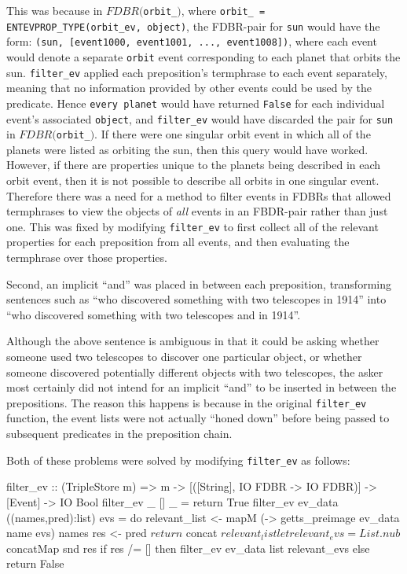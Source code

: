 \documentclass[../main.tex]{subfiles}
\begin{document}
This was because in $FDBR($\texttt{orbit\_}$)$, where \texttt{orbit\_ = ENTEVPROP\_TYPE(orbit\_ev, object)}, the FDBR-pair for \texttt{sun} would have the form: \texttt{(sun, [event1000, event1001, ..., event1008])}, where each event would denote a separate \texttt{orbit} event corresponding to each planet that orbits the sun.  \texttt{filter\_ev} applied each preposition's termphrase to each event separately, meaning that no information provided by other events could be used by the predicate.  Hence \texttt{every planet} would have returned \texttt{False} for each individual event's associated \texttt{object}, and \texttt{filter\_ev} would have discarded the pair for \texttt{sun} in $FDBR($\texttt{orbit\_}$)$.  If there were one singular orbit event in which all of the planets were listed as orbiting the sun, then this query would have worked.  However, if there are properties unique to the planets being described in each orbit event, then it is not possible to describe all orbits in one singular event.  Therefore there was a need for a method to filter events in FDBRs that allowed termphrases to view the objects of {\em all} events in an FBDR-pair rather than just one.  This was fixed by modifying \texttt{filter\_ev} to first collect all of the relevant properties for each preposition from all events,  and then evaluating the termphrase over those properties.

Second, an implicit ``and'' was placed in between each preposition, transforming sentences such as ``who discovered something with two telescopes in 1914'' into ``who discovered something with two telescopes and in 1914''.

Although the above sentence is ambiguous in that it could be asking whether someone used two telescopes to discover one particular object, or whether
someone discovered potentially different objects with two telescopes, the asker most certainly did not intend for an implicit ``and'' to be inserted in between the prepositions.
The reason this happens is because in the original \texttt{filter\_ev} function, the event lists were not actually ``honed down'' before being passed to subsequent predicates in the preposition chain.

Both of these problems were solved by modifying \texttt{filter\_ev} as follows:

\begin{code}
filter_ev :: (TripleStore m) => m -> [([String], IO FDBR -> IO FDBR)] -> [Event] -> IO Bool
filter_ev _ [] _ = return True
filter_ev ev_data ((names,pred):list) evs = do
relevant_list <- mapM (\name -> getts_preimage ev_data name evs) names
res <- pred $ return $ concat $ relevant_list
let relevant_evs = List.nub $ concatMap snd res
if res /= [] then filter_ev ev_data list relevant_evs else return False
\end{code}
\end{document}

